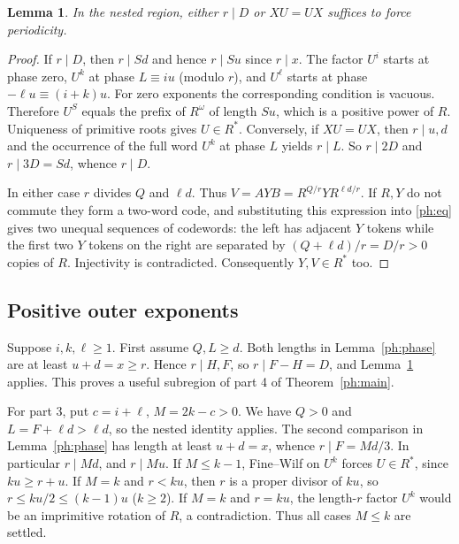 \documentclass[11pt]{article}
\newtheorem{lemma}[theorem]{Lemma}
\theoremstyle{remark}\newtheorem*{remark}{Remark}
\begin{document}
\begin{lemma}\label{ph:prop}
In the nested region, either $r\mid D$ or $XU=UX$ suffices to force
periodicity.
\end{lemma}
\begin{proof}
If $r\mid D$, then $r\mid Sd$ and hence $r\mid Su$ since $r\mid x$.
The factor $U^i$ starts at phase zero, $U^k$ at phase $L\equiv iu$
(modulo $r$), and $U^\ell$ starts at phase $-\ell u\equiv(i+k)u$.
For zero exponents the corresponding condition is vacuous. Therefore
$U^S$ equals the prefix of $R^\omega$ of length $Su$, which is a
positive power of $R$. Uniqueness of primitive roots gives $U\in R^*$.
Conversely, if $XU=UX$, then $r\mid u,d$ and the occurrence of the
full word $U^k$ at phase $L$ yields $r\mid L$. So $r\mid2D$ and
$r\mid3D=Sd$, whence $r\mid D$.

In either case $r$ divides $Q$ and $\ell d$. Thus
$V=AYB=R^{Q/r}Y R^{\ell d/r}$. If $R,Y$ do not commute they form a
two-word code, and substituting this expression into \eqref{ph:eq}
gives two unequal sequences of codewords: the left has adjacent
$Y$ tokens while the first two $Y$ tokens on the right are separated
by $(Q+\ell d)/r=D/r>0$ copies of $R$. Injectivity is contradicted.
Consequently $Y,V\in R^*$ too.
\end{proof}

\subsection{Positive outer exponents}
Suppose $i,k,\ell\ge1$. First assume $Q,L\ge d$. Both lengths in
Lemma~\ref{ph:phase} are at least $u+d=x\ge r$. Hence $r\mid H,F$,
so $r\mid F-H=D$, and Lemma~\ref{ph:prop} applies. This proves a useful subregion of part 4 of Theorem~\ref{ph:main}.

For part 3, put $c=i+\ell$, $M=2k-c>0$. We have $Q>0$ and
$L=F+\ell d>\ell d$, so the nested identity applies. The second
comparison in Lemma~\ref{ph:phase} has length at least $u+d=x$,
whence $r\mid F=Md/3$. In particular $r\mid Md$, and $r\mid Mu$.
If $M\le k-1$, Fine--Wilf on $U^k$ forces $U\in R^*$, since
$ku\ge r+u$. If $M=k$ and $r<ku$, then $r$ is a proper divisor
of $ku$, so $r\le ku/2\le(k-1)u$ ($k\ge2$). If $M=k$ and $r=ku$,
the length-$r$ factor $U^k$ would be an imprimitive rotation of $R$,
a contradiction. Thus all cases $M\le k$ are settled.
\end{document}
